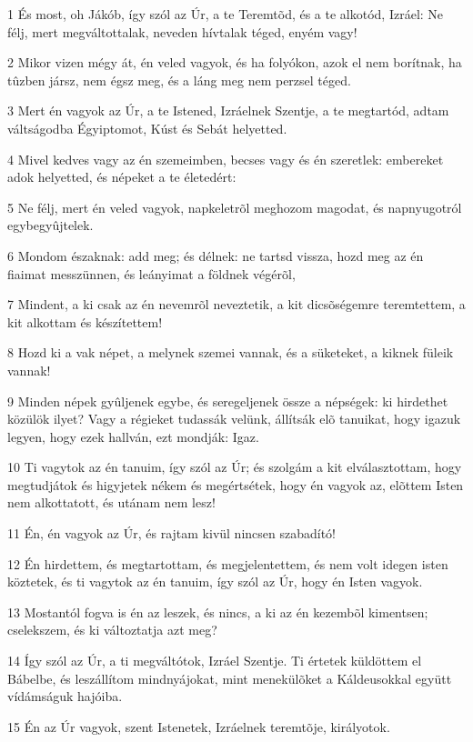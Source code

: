 \par 1 És most, oh Jákób, így szól az Úr, a te Teremtõd, és a te alkotód, Izráel: Ne félj, mert megváltottalak, neveden hívtalak téged, enyém vagy!
\par 2 Mikor vizen mégy át, én veled vagyok, és ha folyókon, azok el nem borítnak, ha tûzben jársz, nem égsz meg, és a láng meg nem perzsel téged.
\par 3 Mert én vagyok az Úr, a te Istened, Izráelnek Szentje, a te megtartód, adtam váltságodba Égyiptomot, Kúst és Sebát helyetted.
\par 4 Mivel kedves vagy az én szemeimben, becses vagy és én szeretlek: embereket adok helyetted, és népeket a te életedért:
\par 5 Ne félj, mert én veled vagyok, napkeletrõl meghozom magodat, és napnyugotról egybegyûjtelek.
\par 6 Mondom északnak: add meg; és délnek: ne tartsd vissza, hozd meg az én fiaimat messzünnen, és leányimat a földnek végérõl,
\par 7 Mindent, a ki csak az én nevemrõl neveztetik, a kit dicsõségemre teremtettem, a kit alkottam és készítettem!
\par 8 Hozd ki a vak népet, a melynek szemei vannak, és a süketeket, a kiknek füleik vannak!
\par 9 Minden népek gyûljenek egybe, és seregeljenek össze a népségek: ki hirdethet közülök ilyet? Vagy a régieket tudassák velünk, állítsák elõ tanuikat, hogy igazuk legyen, hogy ezek hallván, ezt mondják: Igaz.
\par 10 Ti vagytok az én tanuim, így szól az Úr; és szolgám a kit elválasztottam, hogy megtudjátok és higyjetek nékem és megértsétek, hogy én vagyok az, elõttem Isten nem alkottatott, és utánam nem lesz!
\par 11 Én, én vagyok az Úr, és rajtam kivül nincsen szabadító!
\par 12 Én hirdettem, és megtartottam, és megjelentettem, és nem volt idegen isten köztetek, és ti vagytok az én tanuim, így szól az Úr, hogy én Isten vagyok.
\par 13 Mostantól fogva is én az leszek, és nincs, a ki az én kezembõl kimentsen; cselekszem, és ki változtatja azt meg?
\par 14 Így szól az Úr, a ti megváltótok, Izráel Szentje. Ti értetek küldöttem el Bábelbe, és leszállítom mindnyájokat, mint menekülõket a Káldeusokkal együtt vídámságuk hajóiba.
\par 15 Én az Úr vagyok, szent Istenetek, Izráelnek teremtõje, királyotok.
